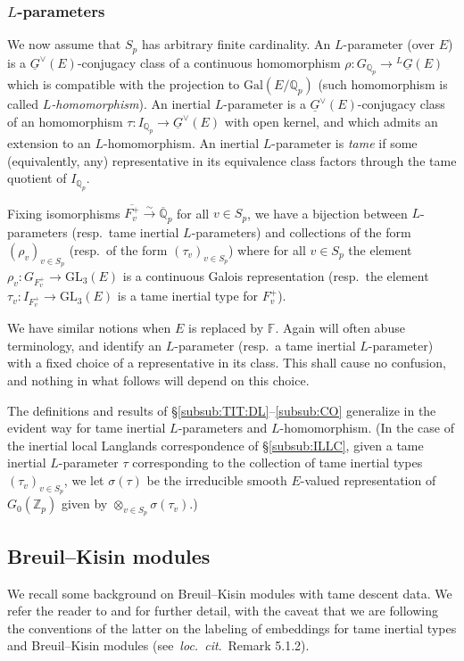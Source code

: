 \documentclass[oneside,a4paper,english, 11pt]{amsart}
\theoremstyle{plain}
\theoremstyle{plain}
\theoremstyle{plain}
\theoremstyle{plain}
\theoremstyle{plain}
\theoremstyle{plain}
\theoremstyle{definition}
\theoremstyle{definition}
\theoremstyle{definition}
\theoremstyle{remark}
\numberwithin{equation}{section}
\newcommand{\Z}{\mathbb{Z}}
\newcommand{\Q}{\mathbb{Q}}
\newcommand{\Qp}{\mathbb{Q}_p}
\newcommand{\F}{\mathbb{F}}
\newcommand{\Gal}{\mathrm{Gal}}
\newcommand{\GL}{\mathrm{GL}}
\newcommand{\un}[1]{\underline{#1}}
\newcommand{\ovl}[1]{\overline{#1}}
\newcommand{\ra}{\rightarrow}
\begin{document}
\subsubsection{$L$-parameters}
\label{subsub:Lp}
We now assume that $S_p$ has arbitrary finite cardinality.
An $L$-parameter (over $E$) is a $\un{G}^\vee(E)$-conjugacy class of a continuous homomorphism $\rho:G_{\Qp}\ra{}^L\un{G}(E)$ which is compatible with the projection to $\Gal(E/\Qp)$ (such homomorphism is called \emph{$L$-homomorphism}).
An inertial $L$-parameter is a $\un{G}^\vee(E)$-conjugacy class of an homomorphism $\tau:I_{\Qp}\ra\un{G}^\vee(E)$ with open kernel, and which admits an extension to an $L$-homomorphism.
An inertial $L$-parameter is \emph{tame} if some (equivalently, any) representative in its equivalence class factors through the tame quotient of $I_{\Qp}$.

Fixing isomorphisms $\ovl{F^+_v}\stackrel{\sim}{\ra}\ovl{\Q}_p$ for all $v\in S_p$, we have a bijection between $L$-parameters (resp.~tame inertial $L$-parameters) and collections of the form $(\rho_v)_{v\in S_p}$ (resp.~of the form $(\tau_v)_{v\in S_p}$) where for all $v\in S_p$ the element $\rho_v:G_{F^+_v}\ra\GL_3(E)$ is a continuous Galois representation (resp.~the element $\tau_v:I_{F^+_v}\ra\GL_3(E)$ is a tame inertial type for $F^+_v$).

We have similar notions when $E$ is replaced by $\F$.
Again will often abuse terminology, and identify an $L$-parameter (resp.~a tame inertial $L$-parameter) with a fixed choice of a representative in its class.
This shall cause no confusion, and 
%
nothing in what follows will depend on this choice.

The definitions and results of \S \ref{subsub:TIT:DL}--\ref{subsub:CO} generalize in the evident way for tame inertial $L$-parameters and $L$-homomorphism.
(In the case of the inertial local Langlands correspondence of \S \ref{subsub:ILLC}, given a tame inertial $L$-parameter $\tau$ corresponding to the collection of tame inertial types $(\tau_v)_{v\in S_p}$, we let $\sigma(\tau)$ be the irreducible smooth $E$-valued representation of $G_0(\Z_p)$ given by $\otimes_{v\in S_p} \sigma(\tau_v)$.)

%

%

\subsection{Breuil--Kisin modules}
\label{subsub:BKM}
We recall some background on Breuil--Kisin modules with tame descent data.
We refer the reader to \cite[\S 3.1,3.2]{LLLM2} and \cite[\S 5.1]{MLM} for further detail, with the caveat that we are following the conventions of the latter on the labeling of embeddings for tame inertial types and Breuil--Kisin modules (see~\emph{loc.~cit}.~Remark 5.1.2).
%
\end{document}
